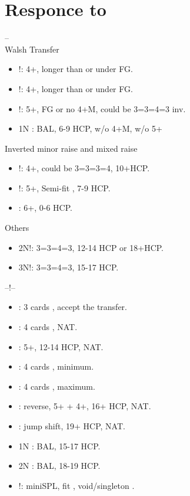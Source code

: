 \documentclass[12pt,twoside,a5paper]{report}%
\begin{document}
\chapter*{Responce to }
	-- \\

	Walsh Transfer
	\begin{itemize}
	\renewcommand{\labelitemi}{}
	\item {}!: 4+\he{}, \he{} longer than \di{} or under FG.
	\item {}!: 4+\sp{}, \sp{} longer than \di{} or under FG.
	\item {}!: 5+\di{}, FG or no 4+M, could be 3=3=4=3 inv.
	\item 1N : BAL, 6-9 HCP, w/o 4+M, w/o 5+\di{}
	\end{itemize}
	
	Inverted minor raise and mixed raise
	\begin{itemize}
	\renewcommand{\labelitemi}{}
	\item {}!: 4+\cl{}, could be 3=3=3=4, 10+HCP. 
	\item {}!: 5+\cl{}, Semi-fit \cl{}, 7-9 HCP.  
	\item {} : 6+\cl{}, 0-6 HCP. 
	\end{itemize}

	Others
	\begin{itemize}
	\renewcommand{\labelitemi}{}
	\item 2N!: 3=3=4=3, 12-14 HCP or 18+HCP.
	\item 3N!: 3=3=4=3, 15-17 HCP.
	\end{itemize}

	--!--
	\begin{itemize}
	\renewcommand{\labelitemi}{}
	\item {} : 3 cards \he{}, accept the transfer.
	\item {} : 4 cards \sp{}, NAT.
	\item {} : 5+\cl{}, 12-14 HCP, NAT.
	\item {} : 4 cards \he{}, minimum.
	\item {} : 4 cards \he{}, maximum.
	\item {} : reverse, 5+\cl{} + 4+\di{}, 16+ HCP, NAT.
	\item {} : jump shift, 19+ HCP, NAT. 
	\item 1N : BAL, 15-17 HCP.
	\item 2N : BAL, 18-19 HCP.
	\item {}!: miniSPL, fit \he{}, void/singleton \di{}.
	\end{itemize}
\end{document}
